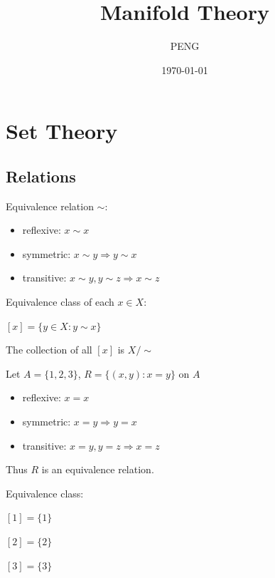 \documentclass{article}
\title{Manifold Theory}
\author{PENG}
\date{\today}
\begin{document}
\maketitle
\tableofcontents
\section{Set Theory}
\subsection{Relations}
\begin{definition}
    Equivalence relation $\sim$:

    \begin{itemize}
        \item reflexive: $x \sim x$
        \item symmetric: $x \sim y \Rightarrow y \sim x$
        \item transitive: $x \sim y, y \sim z \Rightarrow x \sim z$
    \end{itemize}
\end{definition}

\begin{definition}
    Equivalence class of each $x \in X$:

    $[x] = \{y \in X : y \sim x\}$
\end{definition}

\begin{definition}
    The collection of all $[x]$ is $X/\sim$
\end{definition}

\begin{example}
    Let $A = \{1,2,3\}$, $R = \{(x,y) : x = y\}$ on $A$

    \begin{itemize}
        \item reflexive: $x=x$
        \item symmetric: $x=y \Rightarrow y=x$
        \item transitive: $x=y,y=z \Rightarrow x=z$
    \end{itemize}

    Thus $R$ is an equivalence relation.

    Equivalence class:

    $[1] = \{1\}$

    $[2] = \{2\}$

    $[3] = \{3\}$
\end{example}
\end{document}
